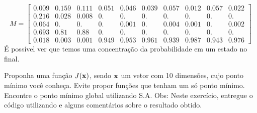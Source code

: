 \documentclass{homeworkclass}
\begin{document}
\begin{homeworkProblem}
\begin{homeworkSection}
\begin{equation*}
M = \begin{bmatrix}
0.009 & 0.159 & 0.111 & 0.051 & 0.046 & 0.039 & 0.057 & 0.012 & 0.057 &
0.022 \\
0.216 & 0.028 & 0.008 & 0.    & 0.    & 0.    & 0.    & 0.    & 0.    &
0.   \\
0.064 & 0.    & 0.    & 0.    & 0.001 & 0.    & 0.004 & 0.001 & 0.    &
0.002 \\
0.693 & 0.81  & 0.88  & 0.    & 0.    & 0.    & 0.    & 0.    & 0.    &
0.   \\
0.018 & 0.003 & 0.001 & 0.949 & 0.953 & 0.961 & 0.939 & 0.987 & 0.943 & 0.976
\end{bmatrix}
\end{equation*}
É possível ver que temos uma concentração da probabilidade em um estado no final.

\end{homeworkSection}



\end{homeworkProblem}

\begin{homeworkProblem}
Proponha uma função $J(\mathbf{x})$, sendo $\mathbf{x}$ um vetor com 10 dimensões, cujo ponto mínimo você conheça. Evite propor funções que tenham um só ponto mínimo. Encontre o ponto mínimo global utilizando S.A. Obs: Neste exercício, entregue o código utilizando e alguns comentários sobre o resultado obtido.
\end{homeworkProblem}
\end{document}
